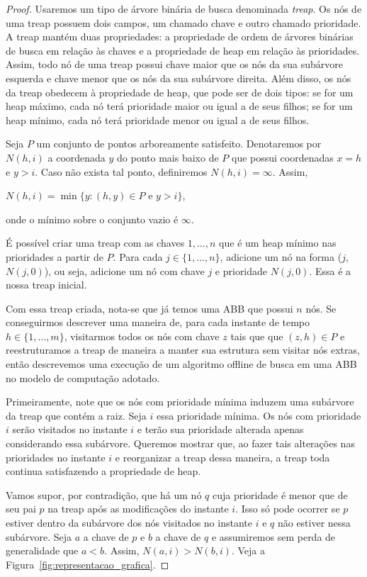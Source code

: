 \begin{proof}\label{prova:ASS}
Usaremos um tipo de árvore binária de busca denominada \textit{treap}. Os nós de uma treap possuem dois campos, um chamado chave e outro chamado prioridade. A treap mantém duas propriedades: a propriedade de ordem de árvores binárias de busca em relação às chaves e a propriedade de heap em relação às prioridades. Assim, todo nó de uma treap possui chave maior que os nós da sua subárvore esquerda e chave menor que os nós da sua subárvore direita. Além disso, os nós da treap obedecem à propriedade de heap, que pode ser de dois tipos: se for um heap máximo, cada nó terá prioridade maior ou igual a de seus filhos; se for um heap mínimo, cada nó terá prioridade menor ou igual a de seus filhos.

Seja $P$ um conjunto de pontos arboreamente satisfeito. Denotaremos por $N(h,i)$ a coordenada $y$ do ponto mais baixo de $P$ que possui coordenadas $x = h$ e $y > i$. Caso não exista tal ponto, definiremos $N(h,i) = \infty$. Assim, 
\begin{center}
    $N(h,i) = \min\{y : (h,y) \in P \text{ e } y > i\}$,
\end{center}
onde o mínimo sobre o conjunto vazio é $\infty$.

É possível criar uma treap com as chaves $1,\ldots,n$ que é um heap mínimo nas prioridades a partir de $P$. Para cada $j \in \{1,\ldots,n\}$, adicione um nó na forma ($j$, $N(j,0)$), ou seja, adicione um nó com chave $j$ e prioridade $N(j,0)$. Essa é a nossa treap inicial.

Com essa treap criada, nota-se que já temos uma ABB que possui $n$ nós. Se conseguirmos descrever uma maneira de, para cada instante de tempo $h \in \{1,\ldots,m\}$, visitarmos todos os nós com chave $z$ tais que que $(z,h) \in P$ e reestruturamos a treap de maneira a manter sua estrutura sem visitar nós extras, então descrevemos uma execução de um algoritmo offline de busca em uma ABB no modelo de computação adotado.

Primeiramente, note que os nós com prioridade mínima induzem uma subárvore da treap que contém a raiz.
Seja $i$ essa prioridade mínima. Os nós com prioridade $i$ serão visitados no instante $i$ e terão sua prioridade alterada apenas considerando essa subárvore. Queremos mostrar que, ao fazer tais alterações nas prioridades no instante $i$ e reorganizar a treap dessa maneira, a treap toda continua satisfazendo a propriedade de heap.

Vamos supor, por contradição, que há um nó $q$ cuja prioridade é menor que de seu pai $p$ na treap após as modificações do instante $i$. Isso só pode ocorrer se $p$ estiver dentro da subárvore dos nós visitados no instante $i$ e $q$ não estiver nessa subárvore. Seja $a$ a chave de $p$ e $b$ a chave de $q$ e assumiremos sem perda de generalidade que $a < b$. Assim, $N(a,i) > N(b,i)$. Veja a Figura~\ref{fig:representacao_grafica}.


\end{proof}
